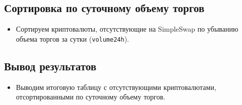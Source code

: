 \documentclass[12pt]{article}
\theoremstyle{indented}
\theoremstyle{definition}
\theoremstyle{remark}
\begin{document}
\subsection{Сортировка по суточному объему торгов}
\begin{itemize}
    \item Сортируем криптовалюты, отсутствующие на SimpleSwap по убыванию объема торгов за сутки (\texttt{volume24h}).
\end{itemize}

\subsection{Вывод результатов}
\begin{itemize}
    \item Выводим итоговую таблицу с отсутствующими криптовалютами, отсортированными по суточному объему торгов.
\end{itemize}
\end{document}
